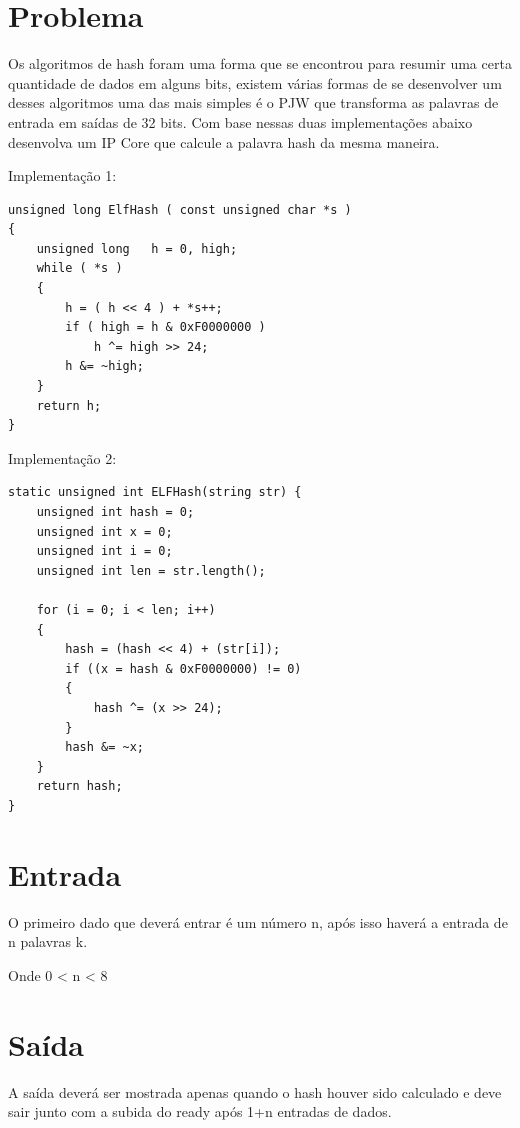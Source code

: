 \documentclass[
    12pt,
    a4paper,
    oneside,
    chapter=TITLE,
    section=TITLE,
    subsection=TITLE,
    subsubsection=TITLE,
    english,
    french,
    spanish,
    brazil,
    ]{abntex2}
\begin{document}
\frenchspacing 
\imprimircapa
\imprimirfolhaderosto

\tableofcontents*
\cleardoublepage

\textual

\chapter{Problema}
Os algoritmos de hash foram uma forma que se encontrou para resumir uma certa quantidade de dados em alguns bits, existem várias formas de se desenvolver um desses algoritmos uma das mais simples é o PJW que transforma as palavras de entrada em saídas de 32 bits. Com base nessas duas implementações abaixo desenvolva um IP Core que calcule a palavra hash da mesma maneira.

\par
Implementação 1:
\begin{lstlisting}
unsigned long ElfHash ( const unsigned char *s )
{
    unsigned long   h = 0, high;
    while ( *s )
    {
        h = ( h << 4 ) + *s++;
        if ( high = h & 0xF0000000 )
            h ^= high >> 24;
        h &= ~high;
    }
    return h;
}
\end{lstlisting}

\par
Implementação 2:
\begin{lstlisting}
static unsigned int ELFHash(string str) {
    unsigned int hash = 0;
    unsigned int x = 0;
    unsigned int i = 0;
    unsigned int len = str.length();

    for (i = 0; i < len; i++)
    {
        hash = (hash << 4) + (str[i]);
        if ((x = hash & 0xF0000000) != 0)
        {
            hash ^= (x >> 24);
        }
        hash &= ~x;
    }
    return hash;
}
\end{lstlisting}



\chapter{Entrada}
O primeiro dado que deverá entrar é um número n, após isso haverá a entrada de n palavras k.
\par
Onde 0 < n < 8

\chapter{Saída}
A saída deverá ser mostrada apenas quando o hash houver sido calculado e deve sair junto com a subida do ready após 1+n entradas de dados.
\end{document}
